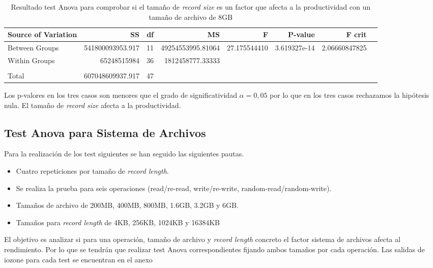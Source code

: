 \begin{table}[!htp]\centering

\scriptsize
\begin{tabular}{lrrrrrrr}\toprule
Source of Variation &SS &df &MS &F &P-value &F crit \\\midrule
Between Groups &541800093953.917 &11 &49254553995.81064 &27.175544410 &3.619327e-14 &2.06660847825 \\
Within Groups &65248515984 &36 &1812458777.33333 & & & \\
& & & & & & \\
Total &607048609937.917 &47 & & & & \\
\bottomrule
\end{tabular}
\caption{Resultado test Anova para comprobar si el tamaño de \textit{record size} es un factor que afecta a la productividad con un tamaño de archivo de 8GB}\label{tab: }
\end{table}


Los p-valores en los tres casos son menores que el grado de significatividad $\alpha = 0,05$ por lo que en los tres casos rechazamos la hipótesis nula. El tamaño de \textit{record size} afecta a la productividad.

\subsection{Test Anova para Sistema de Archivos}
Para la realización de los test siguientes se han seguido las siguientes pautas.
\begin{itemize}
    \item Cuatro repeticiones por tamaño de \textit{record length}.
    \item Se realiza la prueba para seis operaciones (read/re-read, write/re-write, random-read/random-write).
    \item Tamaños de archivo de 200MB, 400MB, 800MB, 1.6GB, 3.2GB y 6GB.
    \item Tamaños para \textit{record length} de 4KB, 256KB, 1024KB y 16384KB
\end{itemize}

El objetivo es analizar si para una operación, tamaño de archivo y \textit{record length} concreto el factor sistema de archivos afecta al rendimiento. Por lo que se tendrán que realizar test Anova correspondientes fijando ambos tamaños por cada operación. Las salidas de iozone para cada test se encuentran en el anexo 